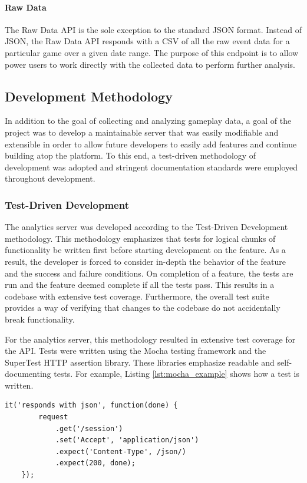 \paragraph{Raw Data}

The Raw Data API is the sole exception to the standard JSON format. Instead of JSON, the Raw Data API responds with a CSV of all the raw event data for a particular game over a given date range. The purpose of this endpoint is to allow power users to work directly with the collected data to perform further analysis.


\subsection{Development Methodology}

In addition to the goal of collecting and analyzing gameplay data, a goal of the project was to develop a maintainable server that was easily modifiable and extensible in order to allow future developers to easily add features and continue building atop the platform. To this end, a test-driven methodology of development was adopted and stringent documentation standards were employed throughout development.


\subsubsection{Test-Driven Development}

The analytics server was developed according to the Test-Driven Development methodology. This methodology emphasizes that tests for logical chunks of functionality be written first before starting development on the feature. As a result, the developer is forced to consider in-depth the behavior of the feature and the success and failure conditions. On completion of a feature, the tests are run and the feature deemed complete if all the tests pass. This results in a codebase with extensive test coverage. Furthermore, the overall test suite provides a way of verifying that changes to the codebase do not accidentally break functionality. 

For the analytics server, this methodology resulted in extensive test coverage for the API. Tests were written using the Mocha testing framework and the SuperTest HTTP assertion library. These libraries emphasize readable and self-documenting tests. For example, Listing \ref{lst:mocha_example} shows how a test is written.

\medskip
\begin{lstlisting}[caption={[Example API Test]Example Mocha test{,} testing that the Session API responds in JSON}, label={lst:mocha_example}]
	it('responds with json', function(done) {
		request
			.get('/session')
			.set('Accept', 'application/json')
			.expect('Content-Type', /json/)
			.expect(200, done);
	});
\end{lstlisting}

